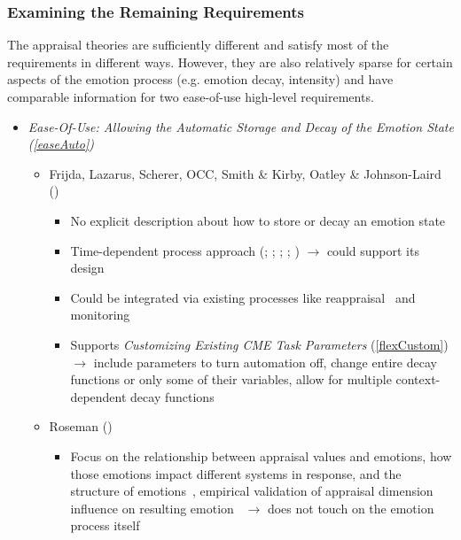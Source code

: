 \subsubsection{Examining the Remaining Requirements}
The appraisal theories are sufficiently different and satisfy most of the
requirements in different ways. However, they are also relatively sparse for
certain aspects of the emotion process (e.g. emotion decay, intensity) and have
comparable information for two ease-of-use high-level requirements.

\begin{itemize}

    \item \textit{Ease-Of-Use: Allowing the Automatic Storage and Decay of the
        Emotion State (\ref{easeAuto})}
    \begin{itemize}
        \item Frijda, Lazarus, Scherer, OCC, Smith \& Kirby, Oatley \&
        Johnson-Laird (\good)
        \begin{itemize}
            \item No explicit description about how to store or decay an
            emotion state

            \item Time-dependent process approach
            (; ; ; ;
            ) $\rightarrow$ could support its
            design

            \item Could be integrated via existing processes like
            reappraisal~\citep[p.~99]{scherer2001appraisalB} and
            monitoring~\citep[p.~129--130]{smith2001toward}

            \item Supports \textit{Customizing Existing CME Task Parameters}
            (\ref{flexCustom}) $\rightarrow$ include parameters to turn
            automation off, change entire decay functions or only some of their
            variables, allow for multiple context-dependent decay functions
        \end{itemize}

        \item Roseman (\disqualified)
        \begin{itemize}
            \item Focus on the relationship between appraisal values and
            emotions, how those emotions impact different systems in response,
            and the structure of emotions~\citep[p.~68, 81]{roseman2001model},
            empirical validation of appraisal dimension influence on resulting
            emotion~\citep[p.~242, 244]{roseman1996appraisal} $\rightarrow$
            does not touch on the emotion process itself
        \end{itemize}
    \end{itemize}


\end{itemize}
